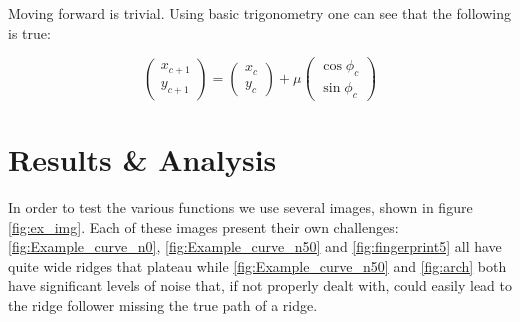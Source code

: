 \documentclass[11pt,a4paper]{article}
\begin{document}
\begin{multicols}{2}
		Moving forward is trivial. Using basic trigonometry one can see that the following is true:

		\begin{equation}
			\begin{pmatrix}
			x_{c+1} \\
			y_{c+1}
			\end{pmatrix}
			=
			\begin{pmatrix}
			x_c \\
			y_c
			\end{pmatrix}
			+ \mu
			\begin{pmatrix}
			\cos{\phi_c} \\
			\sin{\phi_c}
			\end{pmatrix}
		\end{equation}

\section{Results \& Analysis}
	In order to test the various functions we use several images, shown in figure \ref{fig:ex_img}. Each of these images present their own challenges: \ref{fig:Example_curve_n0}, \ref{fig:Example_curve_n50} and \ref{fig:fingerprint5} all have quite wide ridges that plateau while \ref{fig:Example_curve_n50} and \ref{fig:arch} both have significant levels of noise that, if not properly dealt with, could easily lead to the ridge follower missing the true path of a ridge.


\end{multicols}
\end{document}
